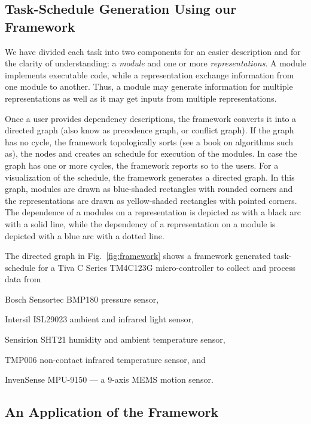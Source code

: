 \documentclass[]{IEEEtran}
\begin{document}
\subsection{Task-Schedule Generation Using our Framework}
\label{FrameWorkDescription}


We have divided each task into two components for an easier description and for
the clarity of understanding: a {\em module} and one or more {\em
representations}. A module implements executable code, while a representation
exchange information from one module to another. Thus, a module may generate
information for multiple representations as well as it may get inputs from
multiple representations.  \par Once a user provides dependency descriptions,
the framework converts it  into a directed graph (also know as precedence
graph, or conflict graph).  If the graph has no cycle, the framework
topologically sorts (see a book on algorithms such
as\cite{Cormen:AlgorithmBook}), the nodes and creates an schedule for execution
of the modules. In case the graph has one or more cycles, the framework reports
so to the users.  For a visualization of the schedule, the framework  generates
a directed graph. In this graph, modules are drawn as blue-shaded rectangles
with rounded corners and the representations are drawn as yellow-shaded
rectangles with pointed corners. The dependence of a modules on a
representation is depicted as with a black arc with a solid line, while the
dependency of a representation on a module is depicted with a blue arc with a
dotted line. 


The directed graph in Fig.~\ref{fig:framework} shows a framework generated
task-schedule for  a Tiva C Series TM4C123G micro-controller to collect and
process data from \begin{inparaenum}[($i$)] \item Bosch Sensortec BMP180
pressure sensor, \item Intersil ISL29023 ambient and infrared light sensor,
\item Sensirion SHT21 humidity and ambient temperature sensor,  \item  TMP006
non-contact infrared temperature sensor, and \item InvenSense MPU-9150 --- a
9-axis MEMS motion sensor. \end{inparaenum}



\subsection{An Application of the Framework}
\end{document}
